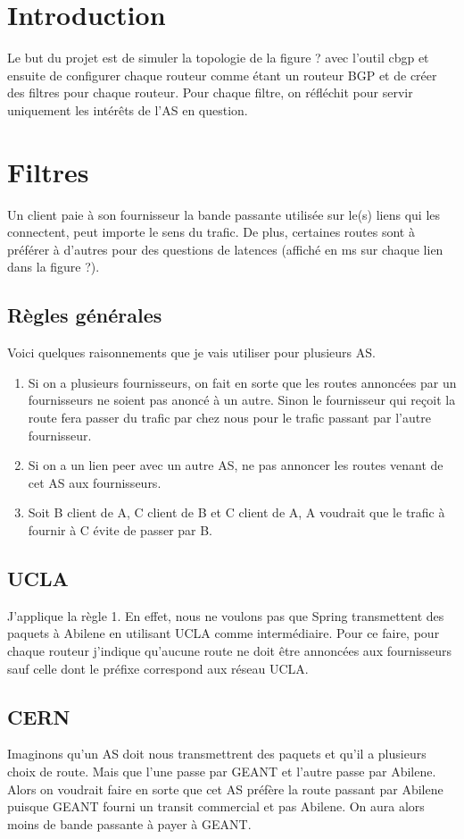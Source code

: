\documentclass[a4paper, 12pt]{report}
\begin{document}


\section*{Introduction}
Le but du projet est de simuler la topologie de la figure ? avec l'outil cbgp et ensuite de configurer chaque routeur comme étant un routeur BGP et de créer des filtres pour chaque routeur.
Pour chaque filtre, on réfléchit pour servir uniquement les intérêts de l'AS en question.

\section{Filtres}
Un client paie à son fournisseur la bande passante utilisée sur le(s) liens qui les connectent, peut importe le sens du trafic.
De plus, certaines routes sont à préférer à d'autres pour des questions de latences (affiché en ms sur chaque lien dans la figure ?).
\subsection{Règles générales}
Voici quelques raisonnements que je vais utiliser pour plusieurs AS.
\begin{enumerate}
 \item Si on a plusieurs fournisseurs, on fait en sorte que les routes annoncées par un fournisseurs ne soient pas anoncé à un autre.
 Sinon le fournisseur qui reçoit la route fera passer du trafic par chez nous pour le trafic passant par l'autre fournisseur.
 \item Si on a un lien peer avec un autre AS, ne pas annoncer les routes venant de cet AS aux fournisseurs.
 \item Soit B client de A, C client de B et C client de A, A voudrait que le trafic à fournir à C évite de passer par B.
\end{enumerate}

\subsection{UCLA}
J'applique la règle 1.
En effet, nous ne voulons pas que Spring transmettent des paquets à Abilene en utilisant UCLA comme intermédiaire.
Pour ce faire, pour chaque routeur j'indique qu'aucune route ne doit être annoncées aux fournisseurs sauf celle dont le préfixe correspond aux réseau UCLA.

\subsection{CERN}
Imaginons qu'un AS doit nous transmettrent des paquets et qu'il a plusieurs choix de route.
Mais que l'une passe par GEANT et l'autre passe par Abilene.
Alors on voudrait faire en sorte que cet AS préfère la route passant par Abilene puisque GEANT fourni un transit commercial et pas Abilene.
On aura alors moins de bande passante à payer à GEANT.
\end{document}
